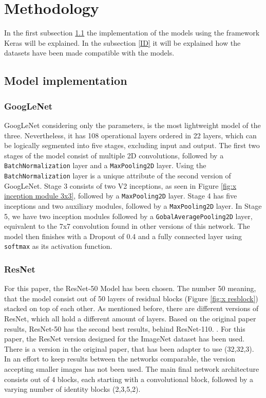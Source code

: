 \documentclass[conference]{IEEEtran}
\begin{document}
\section{Methodology}\label{C3}
In the first subsection \ref{IM} the implementation of the models using the framework Keras will be explained.
In the subsection \ref{ID} it will be explained how the datasets have been made compatible with the models.
\subsection{Model implementation}\label{IM}
\subsubsection{GoogLeNet}
GoogLeNet considering only the parameters, is the most lightweight model of the three. Nevertheless, it has 108 operational layers ordered in 22 layers, which can be logically segmented into five stages, excluding input and output. 
The first two stages of the model consist of multiple 2D convolutions, followed by a \verb|BatchNormalization| layer and a \verb|MaxPooling2D| layer. Using the \verb|BatchNormalization| layer is a unique attribute of the second version of GoogLeNet.
Stage 3 consists of two V2 inceptions, as seen in Figure \ref{fig:x inception module 3x3}, followed by a \verb|MaxPooling2D| layer.
Stage 4 has five inceptions and two auxiliary modules, followed by a \verb|MaxPooling2D| layer. 
In Stage 5, we have two inception modules followed by a \verb|GobalAveragePooling2D| layer, equivalent to the 7x7 convolution found in other versions of this network.
The model then finishes with a Dropout of 0.4 and a fully connected layer using \verb|softmax| as its activation function.
\cite{szegedy_rethinking_2015}

\subsubsection{ResNet}
For this paper, the ResNet-50 Model has been chosen. 
The number 50 meaning, that the model consist out of 50 layers of residual blocks (Figure \ref{fig:x resblock}) stacked on top of each other. 
As mentioned before, there are different versions of ResNet, which all hold a different amount of layers. 
Based on the original paper results, ResNet-50 has the second best results, behind ResNet-110. \cite{he_deep_2015}.  
For this paper, the ResNet version designed for the ImageNet dataset has been used. There is a version in the original paper, that has been adapter to use (32,32,3). 
In an effort to keep results between the networks comparable, the version accepting smaller images has not been used.
The main final network architecture consists out of 4 blocks, each starting with a convolutional block, followed by a varying number of identity blocks (2,3,5,2).
\end{document}
